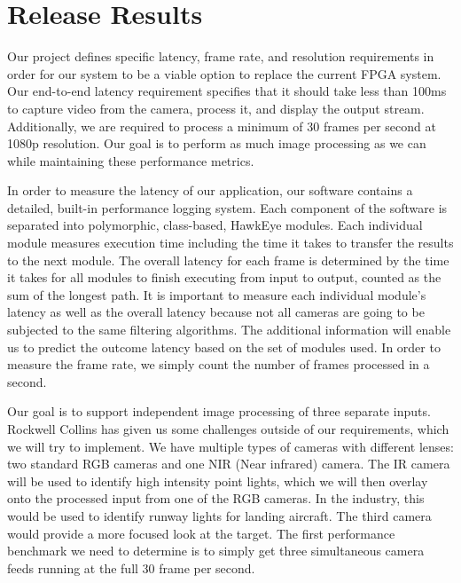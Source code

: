 \documentclass[letterpaper,10pt,titlepage]{IEEEtran}
\begin{document}
   
\section{Release Results}
   Our project defines specific latency, frame rate, and resolution requirements in order for our system to be a viable option to replace the current FPGA system. Our end-to-end latency requirement specifies that it should take less than 100ms to capture video from the camera, process it, and display the output stream. Additionally, we are required to process a minimum of 30 frames per second at 1080p resolution. Our goal is to perform as much image processing as we can while maintaining these performance metrics.\\
\par
In order to measure the latency of our application, our software contains a detailed, built-in performance logging system. Each component of the software is separated into polymorphic, class-based, HawkEye modules. Each individual module measures execution time including the time it takes to transfer the results to the next module. The overall latency for each frame is determined by the time it takes for all modules to finish executing from input to output, counted as the sum of the longest path. It is important to measure each individual module's latency as well as the overall latency because not all cameras are going to be subjected to the same filtering algorithms. The additional information will enable us to predict the outcome latency based on the set of modules used. In order to measure the frame rate, we simply count the number of frames processed in a second.\\
\par
Our goal is to support independent image processing of three separate inputs. Rockwell Collins has given us some challenges outside of our requirements, which we will try to implement. We have multiple types of cameras with different lenses: two standard RGB cameras and one NIR (Near infrared) camera. The IR camera will be used to identify high intensity point lights, which we will then overlay onto the processed input from one of the RGB cameras. In the industry, this would be used to identify runway lights for landing aircraft. The third camera would provide a more focused look at the target. The first performance benchmark we need to determine is to simply get three simultaneous camera feeds running at the full 30 frame per second.\\
\end{document}

